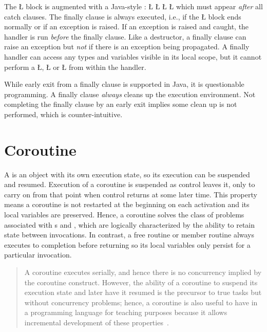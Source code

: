 \documentclass[openright,twoside]{report}
\begin{document}
The \CC \LGinlinetrue\LGbegin\lgrinde\L{}\endlgrinde\LGend{} block is augmented with a Java-style :
\LGinlinefalse\LGbegin\lgrinde
\L{}
\L{\LB{}}
\L{}
\CE{}\L{}
\endlgrinde\LGend
{}%
which must appear \emph{after} all catch clauses.
The finally clause is always executed, i.e., if the \LGinlinetrue\LGbegin\lgrinde\L{}\endlgrinde\LGend{} block ends normally or if an exception is raised.
If an exception is raised and caught, the handler is run \emph{before} the finally clause.
Like a destructor, a finally clause can raise an exception but \emph{not} if there is an exception being propagated.
A finally handler can access any types and variables visible in its local scope, but it cannot perform a \LGinlinetrue\LGbegin\lgrinde\L{}\endlgrinde\LGend{}, \LGinlinetrue\LGbegin\lgrinde\L{}\endlgrinde\LGend{} or \LGinlinetrue\LGbegin\lgrinde\L{}\endlgrinde\LGend{} from within the handler.

\begin{annotation}
While early exit from a finally clause is supported in Java, it is questionable programming.
A finally clause \emph{always} cleans up the execution environment.
Not completing the finally clause by an early exit implies some clean up is not performed, which is counter-intuitive.
\end{annotation}


\section{Coroutine}
\label{s:Coroutine}

A  is an object with its own execution state, so its execution can be suspended and resumed.
Execution of a coroutine is suspended as control leaves it, only to carry on from that point when control returns at some later time.
This property means a coroutine is not restarted at the beginning on each activation and its local variables are preserved.
Hence, a coroutine solves the class of problems associated with s and , which are logically characterized by the ability to retain state between invocations.
In contrast, a free routine or member routine always executes to completion before returning so its local variables only persist for a particular invocation.
\begin{quote}
A coroutine executes serially, and hence there is no concurrency implied by the coroutine construct.
However, the ability of a coroutine to suspend its execution state and later have it resumed is the precursor to true tasks but without concurrency problems;
hence, a coroutine is also useful to have in a programming language for teaching purposes because it allows incremental development of these properties~\cite{Yeager91}.
\end{quote}
\end{document}
